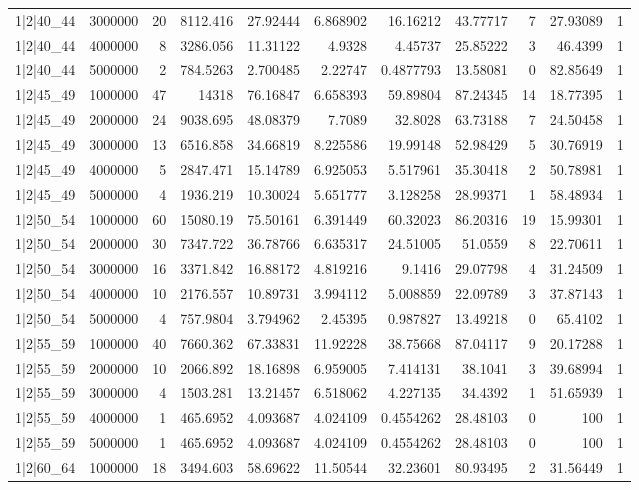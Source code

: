 \begin{tabular}{lrrrrrrrrrr}
1|2|40\_44 & 3000000 & 20 & 8112.416 & 27.92444 & 6.868902 & 16.16212 & 43.77717 & 7 & 27.93089 & 1 \\
1|2|40\_44 & 4000000 & 8 & 3286.056 & 11.31122 & 4.9328 & 4.45737 & 25.85222 & 3 & 46.4399 & 1 \\
1|2|40\_44 & 5000000 & 2 & 784.5263 & 2.700485 & 2.22747 & 0.4877793 & 13.58081 & 0 & 82.85649 & 1 \\
1|2|45\_49 & 1000000 & 47 & 14318 & 76.16847 & 6.658393 & 59.89804 & 87.24345 & 14 & 18.77395 & 1 \\
1|2|45\_49 & 2000000 & 24 & 9038.695 & 48.08379 & 7.7089 & 32.8028 & 63.73188 & 7 & 24.50458 & 1 \\
1|2|45\_49 & 3000000 & 13 & 6516.858 & 34.66819 & 8.225586 & 19.99148 & 52.98429 & 5 & 30.76919 & 1 \\
1|2|45\_49 & 4000000 & 5 & 2847.471 & 15.14789 & 6.925053 & 5.517961 & 35.30418 & 2 & 50.78981 & 1 \\
1|2|45\_49 & 5000000 & 4 & 1936.219 & 10.30024 & 5.651777 & 3.128258 & 28.99371 & 1 & 58.48934 & 1 \\
1|2|50\_54 & 1000000 & 60 & 15080.19 & 75.50161 & 6.391449 & 60.32023 & 86.20316 & 19 & 15.99301 & 1 \\
1|2|50\_54 & 2000000 & 30 & 7347.722 & 36.78766 & 6.635317 & 24.51005 & 51.0559 & 8 & 22.70611 & 1 \\
1|2|50\_54 & 3000000 & 16 & 3371.842 & 16.88172 & 4.819216 & 9.1416 & 29.07798 & 4 & 31.24509 & 1 \\
1|2|50\_54 & 4000000 & 10 & 2176.557 & 10.89731 & 3.994112 & 5.008859 & 22.09789 & 3 & 37.87143 & 1 \\
1|2|50\_54 & 5000000 & 4 & 757.9804 & 3.794962 & 2.45395 & 0.987827 & 13.49218 & 0 & 65.4102 & 1 \\
1|2|55\_59 & 1000000 & 40 & 7660.362 & 67.33831 & 11.92228 & 38.75668 & 87.04117 & 9 & 20.17288 & 1 \\
1|2|55\_59 & 2000000 & 10 & 2066.892 & 18.16898 & 6.959005 & 7.414131 & 38.1041 & 3 & 39.68994 & 1 \\
1|2|55\_59 & 3000000 & 4 & 1503.281 & 13.21457 & 6.518062 & 4.227135 & 34.4392 & 1 & 51.65939 & 1 \\
1|2|55\_59 & 4000000 & 1 & 465.6952 & 4.093687 & 4.024109 & 0.4554262 & 28.48103 & 0 & 100 & 1 \\
1|2|55\_59 & 5000000 & 1 & 465.6952 & 4.093687 & 4.024109 & 0.4554262 & 28.48103 & 0 & 100 & 1 \\
1|2|60\_64 & 1000000 & 18 & 3494.603 & 58.69622 & 11.50544 & 32.23601 & 80.93495 & 2 & 31.56449 & 1 \\

\end{tabular}
